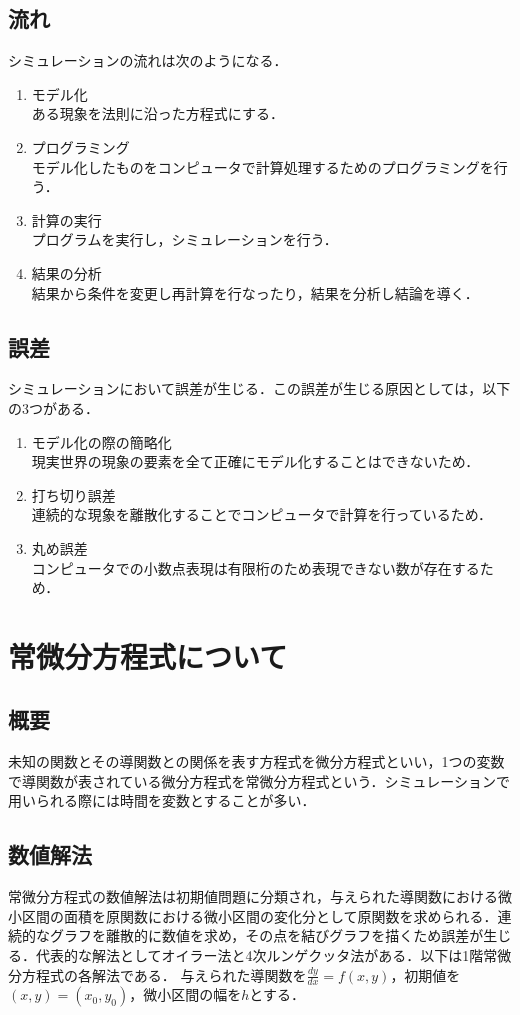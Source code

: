 \documentclass[a4paper, 12pt]{ltjsarticle}
\begin{document}
\subsection{流れ}
シミュレーションの流れは次のようになる．
\begin{enumerate}
\item モデル化\\
ある現象を法則に沿った方程式にする．
\item プログラミング\\
モデル化したものをコンピュータで計算処理するためのプログラミングを行う．
\item 計算の実行\\
プログラムを実行し，シミュレーションを行う．
\item 結果の分析\\
結果から条件を変更し再計算を行なったり，結果を分析し結論を導く．
\end{enumerate}
\subsection{誤差}
シミュレーションにおいて誤差が生じる．この誤差が生じる原因としては，以下の3つがある．
\begin{enumerate}
\item モデル化の際の簡略化\\
現実世界の現象の要素を全て正確にモデル化することはできないため．
\item 打ち切り誤差\\
連続的な現象を離散化することでコンピュータで計算を行っているため．
\item 丸め誤差\\
コンピュータでの小数点表現は有限桁のため表現できない数が存在するため．
\end{enumerate}

\section{常微分方程式について}
\subsection{概要}
未知の関数とその導関数との関係を表す方程式を微分方程式といい，1つの変数で導関数が表されている微分方程式を常微分方程式という．シミュレーションで用いられる際には時間を変数とすることが多い．
\subsection{数値解法}
常微分方程式の数値解法は初期値問題に分類され，与えられた導関数における微小区間の面積を原関数における微小区間の変化分として原関数を求められる．連続的なグラフを離散的に数値を求め，その点を結びグラフを描くため誤差が生じる．代表的な解法としてオイラー法と4次ルンゲクッタ法がある．以下は1階常微分方程式の各解法である．
与えられた導関数を$\frac{dy}{dx}=f(x,y)$，初期値を$(x,y)=(x_0,y_0)$，微小区間の幅を$h$とする．
\end{document}
